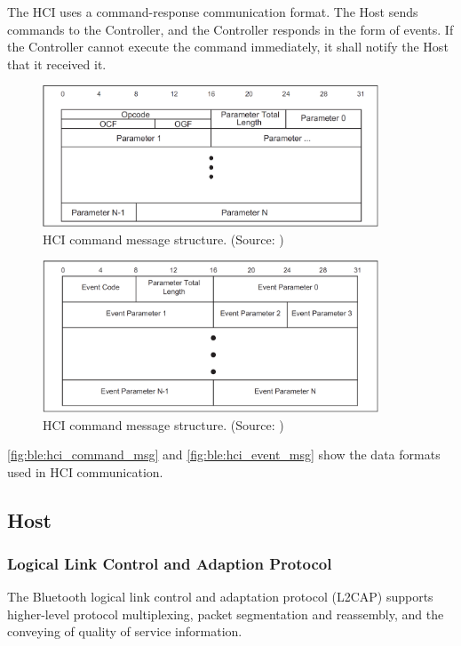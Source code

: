 The HCI uses a command-response communication format.
The Host sends commands to the Controller, and the Controller responds in the form of events.
If the Controller cannot execute the command immediately, it shall notify the Host that it received it.

\begin{figure}[!ht]
    \centering
    \includegraphics[width=100mm, keepaspectratio]{figures/hci_command_msg.png}
    \caption{HCI command message structure. (Source: \cite{bt5})}
    \label{fig:ble:hci_command_msg}
\end{figure}

\begin{figure}[!ht]
    \centering
    \includegraphics[width=100mm, keepaspectratio]{figures/hci_event_msg.png}
    \caption{HCI command message structure. (Source: \cite{bt5})}
    \label{fig:ble:hci_event_msg}
\end{figure}

\autoref{fig:ble:hci_command_msg} and \autoref{fig:ble:hci_event_msg} show the data formats used in HCI communication.

\subsection{Host}
\label{ble:host}
\subsubsection{Logical Link Control and Adaption Protocol}
\label{ble:host:l2cap}
The Bluetooth logical link control and adaptation protocol (L2CAP)
supports higher-level protocol multiplexing, packet segmentation and
reassembly, and the conveying of quality of service information.

